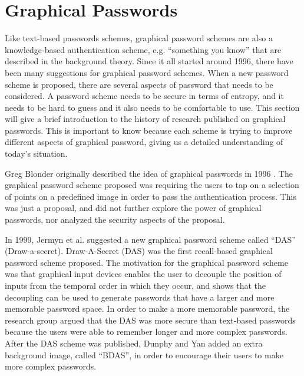 \section{Graphical Passwords}
\label{chapter:literatureReview}


  Like text-based passwords schemes, graphical password schemes are also a knowledge-based authentication scheme, e.g. ``something you know'' that are described in the background theory. Since it all started around 1996, there have been many suggestions for graphical password schemes. When a new password scheme is proposed, there are several aspects of password that needs to be considered. A password scheme needs to be secure in terms of entropy, and it needs to be hard to guess and it also needs to be comfortable to use. This section will give a brief introduction to the history of research published on graphical passwords. This is important to know because each scheme is trying to improve different aspects of graphical password, giving us a detailed understanding of today's situation.

  Greg Blonder originally described the idea of graphical passwords in 1996 \cite{Blonder}. The graphical password scheme proposed was requiring the users to tap on a selection of points on a predefined image in order to pass the authentication process. This was just a proposal, and did not further explore the power of graphical passwords, nor analyzed the security aspects of the proposal.

  In 1999, Jermyn et al. \cite{Jermyn} suggested a new graphical password scheme called ``DAS'' (Draw-a-secret). Draw-A-Secret (DAS) was the first recall-based graphical password scheme proposed. The motivation for the graphical password scheme was that graphical input devices enables the user to decouple the position of inputs from the temporal order in which they occur, and shows that the decoupling can be used to generate passwords that have a larger and more memorable password space. In order to make a more memorable password, the research group argued that the DAS was more secure than text-based passwords because the users were able to remember longer and more complex passwords. After the DAS scheme was published, Dunphy and Yan \cite{BDAS} added an extra background image, called ``BDAS'', in order to encourage their users to make more complex passwords. 

